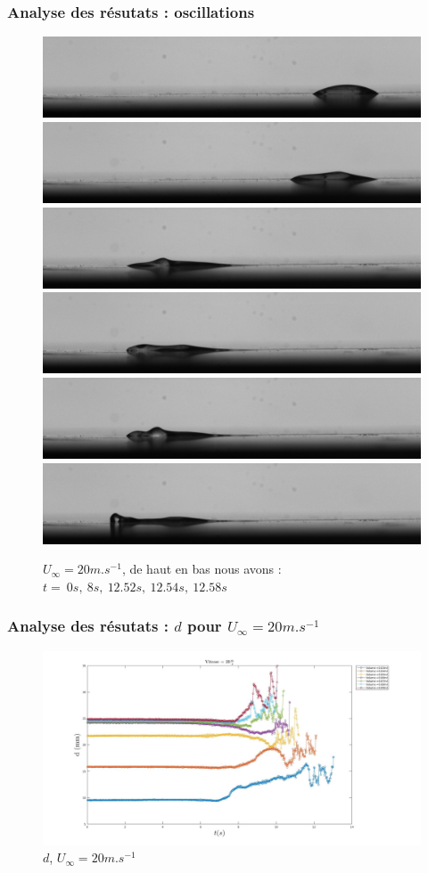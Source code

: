\documentclass{beamer}
\begin{document}
\begin{frame}
\frametitle{Analyse des résutats : oscillations}
\begin{figure}[!ht]
		\includegraphics[width = 0.35\linewidth]{./image/test.jpg}\\
		\includegraphics[width = 0.35\linewidth]{./image/test400.jpg}\\
		\includegraphics[width = 0.35\linewidth]{./image/test626.jpg}\\
		\includegraphics[width = 0.35\linewidth]{./image/test627.jpg}\\
		\includegraphics[width = 0.35\linewidth]{./image/test628.jpg}\\
		\includegraphics[width = 0.35\linewidth]{./image/test629.jpg}
	\caption{$U_{\infty}=20m.s^{-1}$, de haut en bas nous avons :\\
	$t = ~0s,~8s,~12.52s,~12.54s,~12.58s$}
		\label{fig:test}
\end{figure}
\end{frame}

\begin{frame}
\frametitle{Analyse des résutats : $d$ pour $U_{\infty}=20m.s^{-1}$}
\begin{figure}[!ht]
        \centering
		\includegraphics[width = \linewidth]{./image/v=20d.jpg}
	\caption{$d$, $U_{\infty}=20m.s^{-1}$}
		\label{fig:v=20d}
\end{figure}
\end{frame}
\end{document}
